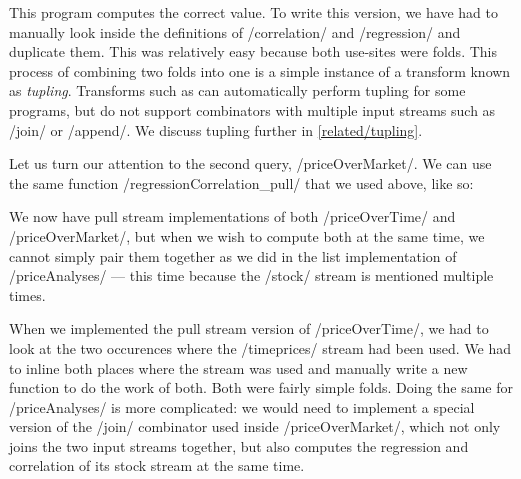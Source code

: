 This program computes the correct value.
To write this version, we have had to manually look inside the definitions of \Hs/correlation/ and \Hs/regression/ and duplicate them.
This was relatively easy because both use-sites were folds.
This process of combining two folds into one is a simple instance of a transform known as \emph{tupling}.
Transforms such as \cite{hu1997tupling,hu2005program,chiba2010program} can automatically perform tupling for some programs, but do not support combinators with multiple input streams such as \Hs/join/ or \Hs/append/.
We discuss tupling further in \cref{related/tupling}.



Let us turn our attention to the second query, \Hs/priceOverMarket/.
We can use the same function \Hs/regressionCorrelation_pull/ that we used above, like so:


We now have pull stream implementations of both \Hs/priceOverTime/ and \Hs/priceOverMarket/, but when we wish to compute both at the same time, we cannot simply pair them together as we did in the list implementation of \Hs/priceAnalyses/ --- this time because the \Hs/stock/ stream is mentioned multiple times.

When we implemented the pull stream version of \Hs/priceOverTime/, we had to look at the two occurences where the \Hs/timeprices/ stream had been used.
We had to inline both places where the stream was used and manually write a new function to do the work of both.
Both were fairly simple folds.
Doing the same for \Hs/priceAnalyses/ is more complicated: we would need to implement a special version of the \Hs/join/ combinator used inside \Hs/priceOverMarket/, which not only joins the two input streams together, but also computes the regression and correlation of its stock stream at the same time.

